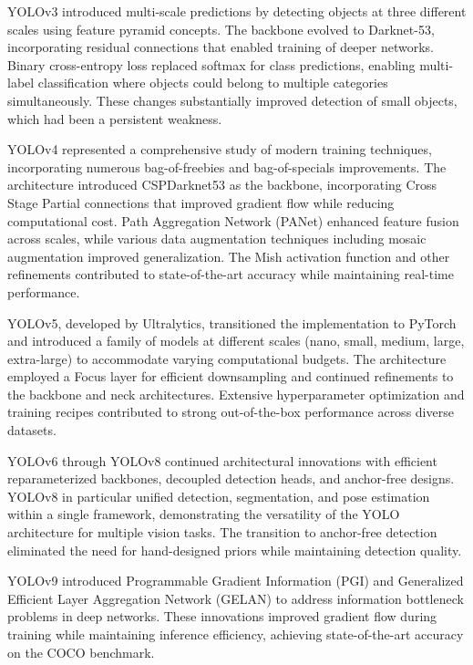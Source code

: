 YOLOv3 introduced multi-scale predictions by detecting objects at three different scales using feature pyramid concepts. The backbone evolved to Darknet-53, incorporating residual connections that enabled training of deeper networks. Binary cross-entropy loss replaced softmax for class predictions, enabling multi-label classification where objects could belong to multiple categories simultaneously. These changes substantially improved detection of small objects, which had been a persistent weakness.

YOLOv4 represented a comprehensive study of modern training techniques, incorporating numerous bag-of-freebies and bag-of-specials improvements. The architecture introduced CSPDarknet53 as the backbone, incorporating Cross Stage Partial connections that improved gradient flow while reducing computational cost. Path Aggregation Network (PANet) enhanced feature fusion across scales, while various data augmentation techniques including mosaic augmentation improved generalization. The Mish activation function and other refinements contributed to state-of-the-art accuracy while maintaining real-time performance.

YOLOv5, developed by Ultralytics, transitioned the implementation to PyTorch and introduced a family of models at different scales (nano, small, medium, large, extra-large) to accommodate varying computational budgets. The architecture employed a Focus layer for efficient downsampling and continued refinements to the backbone and neck architectures. Extensive hyperparameter optimization and training recipes contributed to strong out-of-the-box performance across diverse datasets.

YOLOv6 through YOLOv8 continued architectural innovations with efficient reparameterized backbones, decoupled detection heads, and anchor-free designs. YOLOv8 in particular unified detection, segmentation, and pose estimation within a single framework, demonstrating the versatility of the YOLO architecture for multiple vision tasks. The transition to anchor-free detection eliminated the need for hand-designed priors while maintaining detection quality.

YOLOv9 introduced Programmable Gradient Information (PGI) and Generalized Efficient Layer Aggregation Network (GELAN) to address information bottleneck problems in deep networks. These innovations improved gradient flow during training while maintaining inference efficiency, achieving state-of-the-art accuracy on the COCO benchmark.

